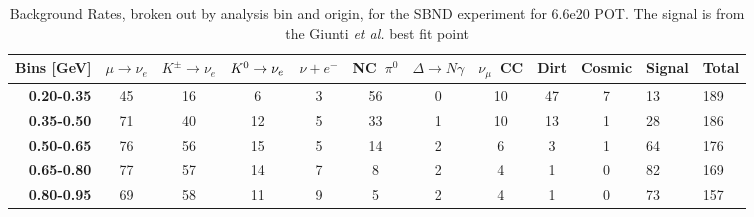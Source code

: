 \begin{table}
\centering

\caption[SBND Electron Neutrino Event Rate Expectations]{Background Rates, broken out by analysis bin and origin, for the SBND experiment for 6.6e20 POT. The signal is from the Giunti {\em et al.} best fit point}
\label{tab:sbn_event_rates_no_signal}
\begin{tabular}{r|cccccccccll}
\multicolumn{1}{l|}{Bins [GeV]} & \multicolumn{1}{l}{$\mu\rightarrow\nu_e$} & \multicolumn{1}{l}{$K^{\pm}\rightarrow \nu_e$} & \multicolumn{1}{l}{$K^0 \rightarrow \nu_{e}$} & \multicolumn{1}{l}{$\nu + e^-$} & \multicolumn{1}{l}{NC~$\pi^0$} & \multicolumn{1}{l}{$\Delta \rightarrow N\gamma$} & \multicolumn{1}{l}{$\nu_{\mu}$~CC} & \multicolumn{1}{l}{Dirt} & \multicolumn{1}{l}{Cosmic} & Signal               & Total \\ \hline
\textbf{0.20-0.35}    & 45                          & 16                          & 6                           & 3                        & 56                         & 0                          & 10                         & 47                       & 7                          & 13                   & 189   \\
\textbf{0.35-0.50}    & 71                          & 40                          & 12                          & 5                        & 33                         & 1                          & 10                         & 13                       & 1                          & 28                   & 186   \\
\textbf{0.50-0.65}    & 76                          & 56                          & 15                          & 5                        & 14                         & 2                          & 6                          & 3                        & 1                          & 64                   & 176   \\
\textbf{0.65-0.80}    & 77                          & 57                          & 14                          & 7                        & 8                          & 2                          & 4                          & 1                        & 0                          & 82                   & 169   \\
\textbf{0.80-0.95}    & 69                          & 58                          & 11                          & 9                        & 5                          & 2                          & 4                          & 1                        & 0                          & 73                   & 157   \\

\end{tabular}
\end{table}
